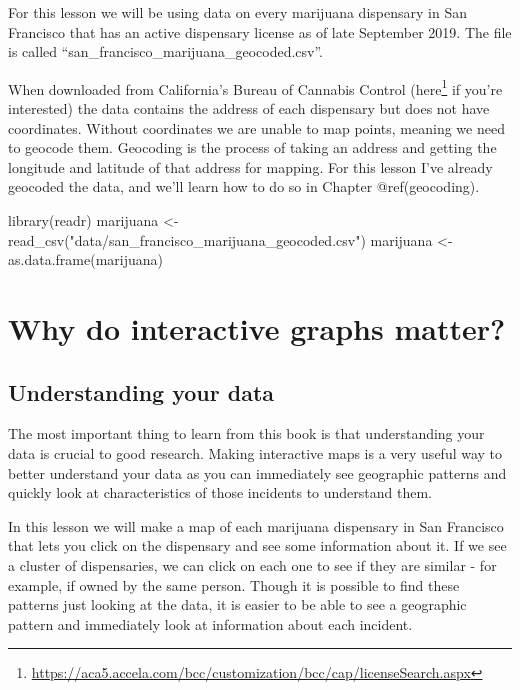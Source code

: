 \documentclass[
  a4paper,
]{krantz}
\makeatletter
\newenvironment{Shaded}{\begin{snugshade}}{\end{snugshade}}
\newcommand{\FunctionTok}[1]{\textcolor[rgb]{0.00,0.00,0.00}{#1}}
\newcommand{\NormalTok}[1]{#1}
\newcommand{\OtherTok}[1]{\textcolor[rgb]{0.56,0.35,0.01}{#1}}
\newcommand{\StringTok}[1]{\textcolor[rgb]{0.31,0.60,0.02}{#1}}
\renewcommand{\href}[2]{#2\footnote{\url{#1}}}
\newenvironment{kframe}{%
\medskip{}
\setlength{\fboxsep}{.8em}
 \def\at@end@of@kframe{}%
 \ifinner\ifhmode%
  \def\at@end@of@kframe{\end{minipage}}%
  \begin{minipage}{\columnwidth}%
 \fi\fi%
 \def\FrameCommand##1{\hskip\@totalleftmargin \hskip-\fboxsep
 \colorbox{shadecolor}{##1}\hskip-\fboxsep
     \hskip-\linewidth \hskip-\@totalleftmargin \hskip\columnwidth}%
 \MakeFramed {\advance\hsize-\width
   \@totalleftmargin\z@ \linewidth\hsize
   \@setminipage}}%
 {\par\unskip\endMakeFramed%
 \at@end@of@kframe}
\renewenvironment{Shaded}{\begin{kframe}}{\end{kframe}}
\makeatother
\begin{document}
For this lesson we will be using data on every marijuana
dispensary in San Francisco that has an active dispensary
license as of late September 2019. The file is called
``san\_francisco\_marijuana\_geocoded.csv''.

When downloaded from California's Bureau of Cannabis Control
(\href{https://aca5.accela.com/bcc/customization/bcc/cap/licenseSearch.aspx}{here}
if you're interested) the data contains the address of each
dispensary but does not have coordinates. Without
coordinates we are unable to map points, meaning we need to
geocode them. Geocoding is the process of taking an address
and getting the longitude and latitude of that address for
mapping. For this lesson I've already geocoded the data, and
we'll learn how to do so in Chapter @ref(geocoding).

\begin{Shaded}
\begin{Highlighting}[]
\FunctionTok{library}\NormalTok{(readr)}
\NormalTok{marijuana }\OtherTok{\textless{}{-}} \FunctionTok{read\_csv}\NormalTok{(}\StringTok{"data/san\_francisco\_marijuana\_geocoded.csv"}\NormalTok{)}
\NormalTok{marijuana }\OtherTok{\textless{}{-}} \FunctionTok{as.data.frame}\NormalTok{(marijuana)}
\end{Highlighting}
\end{Shaded}

\hypertarget{why-do-interactive-graphs-matter}{%
\section{Why do interactive graphs
matter?}\label{why-do-interactive-graphs-matter}}

\hypertarget{understanding-your-data}{%
\subsection{Understanding your
data}\label{understanding-your-data}}

The most important thing to learn from this book is that
understanding your data is crucial to good research. Making
interactive maps is a very useful way to better understand
your data as you can immediately see geographic patterns and
quickly look at characteristics of those incidents to
understand them.

In this lesson we will make a map of each marijuana
dispensary in San Francisco that lets you click on the
dispensary and see some information about it. If we see a
cluster of dispensaries, we can click on each one to see if
they are similar - for example, if owned by the same person.
Though it is possible to find these patterns just looking at
the data, it is easier to be able to see a geographic
pattern and immediately look at information about each
incident.
\end{document}
